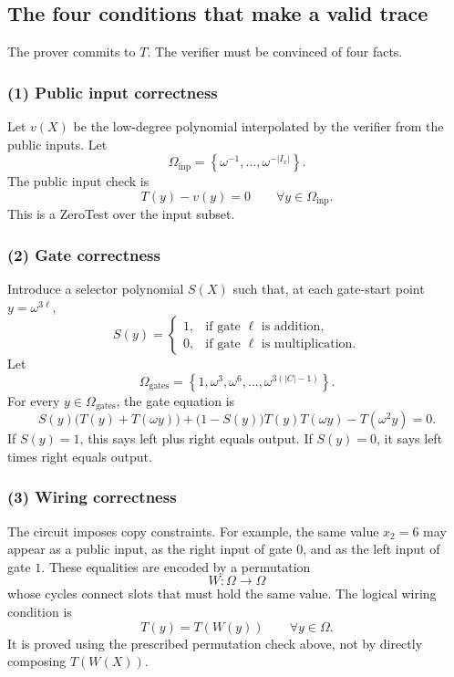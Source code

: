 \documentclass[11pt]{article}
\newcommand{\set}[1]{\left\{#1\right\}}
\begin{document}
\subsection{The four conditions that make a valid trace}

The prover commits to $T$. The verifier must be convinced of four facts.

\subsubsection*{(1) Public input correctness}

Let $v(X)$ be the low-degree polynomial interpolated by the verifier from the public inputs. Let
\[
    \Omega_{\mathrm{inp}}=\set{\omega^{-1},\ldots,\omega^{-|I_x|}}.
\]
The public input check is
\[
    T(y)-v(y)=0
    \qquad\forall y\in\Omega_{\mathrm{inp}}.
\]
This is a ZeroTest over the input subset.

\subsubsection*{(2) Gate correctness}

Introduce a selector polynomial $S(X)$ such that, at each gate-start point $y=\omega^{3\ell}$,
\[
S(y)=
\begin{cases}
1,&\text{if gate }\ell\text{ is addition},\\
0,&\text{if gate }\ell\text{ is multiplication}.
\end{cases}
\]
Let
\[
    \Omega_{\mathrm{gates}}=\set{1,\omega^3,\omega^6,\ldots,\omega^{3(|C|-1)}}.
\]
For every $y\in\Omega_{\mathrm{gates}}$, the gate equation is
\[
S(y)\bigl(T(y)+T(\omega y)\bigr)
+\bigl(1-S(y)\bigr)T(y)T(\omega y)
-T(\omega^2y)=0.
\]
If $S(y)=1$, this says left plus right equals output. If $S(y)=0$, it says left times right equals output.

\subsubsection*{(3) Wiring correctness}

The circuit imposes copy constraints. For example, the same value $x_2=6$ may appear as a public input, as the right input of gate $0$, and as the left input of gate $1$. These equalities are encoded by a permutation
\[
    W:\Omega\to\Omega
\]
whose cycles connect slots that must hold the same value. The logical wiring condition is
\[
    T(y)=T(W(y))
    \qquad\forall y\in\Omega.
\]
It is proved using the prescribed permutation check above, not by directly composing $T(W(X))$.
\end{document}

